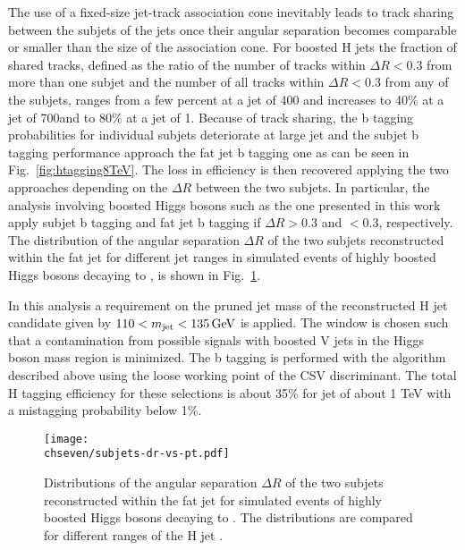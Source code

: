 The use of a fixed-size jet-track association cone inevitably leads to track sharing between the subjets of the jets once their angular separation becomes comparable
or smaller than the size of the association cone. 
For boosted H jets the fraction of shared tracks, defined as the ratio of the number of tracks within $\Delta R < 0.3$
from more than one subjet and the number of all tracks within $\Delta R < 0.3$ from any of the subjets,
ranges from a few percent at a jet \pt of 400\GeV
and increases to 40\% at a jet \pt of 700\GeV and to 80\% at a jet \pt of 1\TeV.
Because of track sharing, the b tagging probabilities for individual subjets deteriorate at large jet \pt and the subjet b tagging performance approach the
fat jet b tagging one as can be seen in Fig.~\ref{fig:htagging8TeV}.
The loss in efficiency is then recovered applying the two approaches depending on the $\Delta R$ between the two subjets.
In particular, the analysis involving boosted Higgs bosons such as the one presented in this work
apply subjet b tagging and fat jet b tagging if $\Delta R > 0.3$ and $< 0.3$, respectively. 
The distribution of the angular separation $\Delta R$ of the two subjets reconstructed within the fat jet for different jet \pt ranges 
in simulated events of highly boosted Higgs bosons decaying to \bbbar, is shown in Fig.~\ref{fig:subjetdR}.

In this analysis a requirement on the pruned jet mass of the reconstructed H jet candidate given by $110 < m_{\text{jet}} < 135\,\text{Ge\hspace{-.08em}V}$ is applied. The \mJ window is chosen such that a contamination from possible signals with boosted V jets in the Higgs boson mass region is minimized. The b tagging is performed with the algorithm described above using the loose working point of the CSV discriminant. The total H tagging efficiency for these selections is about 35\% for jet \pt of about 1 TeV with a mistagging probability below 1\%.

\begin{figure}[!htb]
 \begin{center}
  \texttt{[image: \\chseven/subjets-dr-vs-pt.pdf]}
 \end{center}
 \caption{\small Distributions of the angular separation $\Delta R$ of the two subjets reconstructed within the fat jet for simulated events of highly boosted Higgs bosons decaying to \bbbar. The distributions are compared for different ranges of the H jet \pt.}
 \label{fig:subjetdR}
\end{figure}

